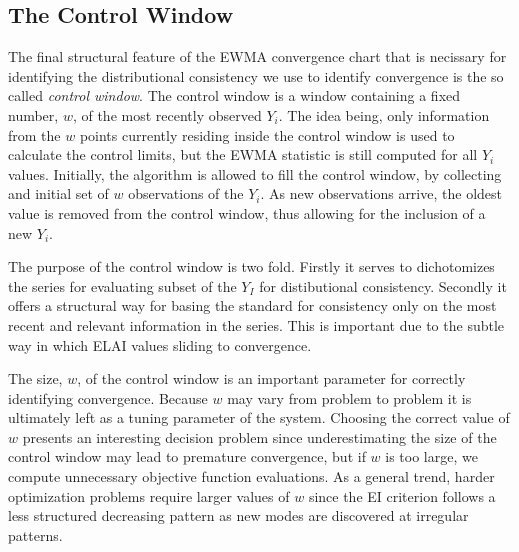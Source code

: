 \documentclass[12pt]{article}
\begin{document}
%
%
\subsection{The Control Window}
%
%

The final structural feature of the EWMA convergence chart that is necissary for identifying the distributional consistency we use to identify convergence is the so called {\it control window}.
%
The control window is a window containing a fixed number, $w$, of the most recently observed $Y_i$.
%
The idea being, only information from the $w$ points currently residing inside the control window is used to calculate the control limits, but the EWMA statistic is still computed for all $Y_i$ values.
%
Initially, the algorithm is allowed to fill the control window, by collecting and initial set of $w$ observations of the $Y_i$.
%
As new observations arrive, the oldest value is removed from the control window, thus allowing for the inclusion of a new $Y_i$.

%
%

%
The purpose of the control window is two fold.
Firstly it serves to dichotomizes the series for evaluating subset of the $Y_I$ for distibutional consistency.
Secondly it offers a structural way for basing the standard for consistency only on the most recent and relevant information in the series. 
%
This is important due to the subtle way in which ELAI values sliding to convergence.

%
%

The size, $w$, of the control window is an important parameter for correctly identifying convergence.
%
Because $w$ may vary from problem to problem it is ultimately left as a tuning parameter of the system.
%
Choosing the correct value of $w$ presents an interesting decision problem since underestimating the size of the control window may lead to premature convergence, but if $w$ is too large, we compute unnecessary objective function evaluations.
%
As a general trend, harder optimization problems require larger values of $w$ since the EI criterion follows a less structured decreasing pattern as new modes are discovered at irregular patterns.
\end{document}

